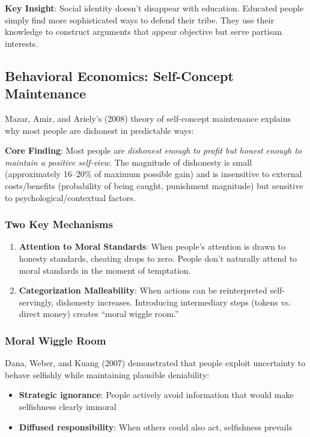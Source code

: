 \documentclass[11pt,a4paper]{article}
\begin{document}
\textbf{Key Insight}: Social identity doesn't disappear with education. Educated people simply find more sophisticated ways to defend their tribe. They use their knowledge to construct arguments that appear objective but serve partisan interests.

\subsection{Behavioral Economics: Self-Concept Maintenance}

Mazar, Amir, and Ariely's (2008) theory of self-concept maintenance explains why most people are dishonest in predictable ways:

\textbf{Core Finding}: Most people are \textit{dishonest enough to profit but honest enough to maintain a positive self-view}. The magnitude of dishonesty is small (approximately 16--20\% of maximum possible gain) and is insensitive to external costs/benefits (probability of being caught, punishment magnitude) but sensitive to psychological/contextual factors.

\subsubsection{Two Key Mechanisms}

\begin{enumerate}[leftmargin=*]
    \item \textbf{Attention to Moral Standards}: When people's attention is drawn to honesty standards, cheating drops to zero. People don't naturally attend to moral standards in the moment of temptation.
    
    \item \textbf{Categorization Malleability}: When actions can be reinterpreted self-servingly, dishonesty increases. Introducing intermediary steps (tokens vs. direct money) creates ``moral wiggle room.''
\end{enumerate}

\subsubsection{Moral Wiggle Room}

Dana, Weber, and Kuang (2007) demonstrated that people exploit uncertainty to behave selfishly while maintaining plausible deniability:
\begin{itemize}[leftmargin=*]
    \item \textbf{Strategic ignorance}: People actively avoid information that would make selfishness clearly immoral
    \item \textbf{Diffused responsibility}: When others could also act, selfishness prevails
\end{itemize}
\end{document}
